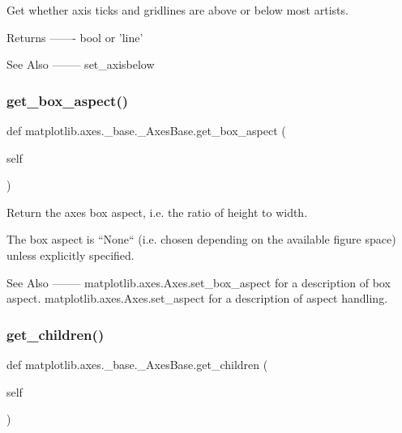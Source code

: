 \begin{DoxyVerb}Get whether axis ticks and gridlines are above or below most artists.

Returns
-------
bool or 'line'

See Also
--------
set_axisbelow
\end{DoxyVerb}
 \mbox{\label{classmatplotlib_1_1axes_1_1__base_1_1__AxesBase_ad02b53a54fa6d100ffec1d0d1cf2264f}} 
\subsubsection{\texorpdfstring{get\+\_\+box\+\_\+aspect()}{get\_box\_aspect()}}
{\footnotesize\ttfamily def matplotlib.\+axes.\+\_\+base.\+\_\+\+Axes\+Base.\+get\+\_\+box\+\_\+aspect (\begin{DoxyParamCaption}\item[{}]{self }\end{DoxyParamCaption})}

\begin{DoxyVerb}Return the axes box aspect, i.e. the ratio of height to width.

The box aspect is ``None`` (i.e. chosen depending on the available
figure space) unless explicitly specified.

See Also
--------
matplotlib.axes.Axes.set_box_aspect
    for a description of box aspect.
matplotlib.axes.Axes.set_aspect
    for a description of aspect handling.
\end{DoxyVerb}
 \mbox{\label{classmatplotlib_1_1axes_1_1__base_1_1__AxesBase_a3f3b81bfe80922e9f27b1913e58461a7}} 
\subsubsection{\texorpdfstring{get\+\_\+children()}{get\_children()}}
{\footnotesize\ttfamily def matplotlib.\+axes.\+\_\+base.\+\_\+\+Axes\+Base.\+get\+\_\+children (\begin{DoxyParamCaption}\item[{}]{self }\end{DoxyParamCaption})}

